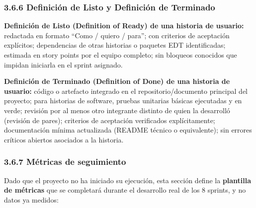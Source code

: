 \documentclass[11pt,a4paper]{article}
\begin{document}
\subsubsection{3.6.6 Definición de Listo y Definición de Terminado}\label{definiciuxf3n-de-listo-y-definiciuxf3n-de-terminado}

\textbf{Definición de Listo (Definition of Ready) de una historia de usuario:} redactada en formato ``Como / quiero / para''; con criterios de aceptación explícitos; dependencias de otras historias o paquetes EDT identificadas; estimada en story points por el equipo completo; sin bloqueos conocidos que impidan iniciarla en el sprint asignado.

\textbf{Definición de Terminado (Definition of Done) de una historia de usuario:} código o artefacto integrado en el repositorio/documento principal del proyecto; para historias de software, pruebas unitarias básicas ejecutadas y en verde; revisión por al menos otro integrante distinto de quien la desarrolló (revisión de pares); criterios de aceptación verificados explícitamente; documentación mínima actualizada (README técnico o equivalente); sin errores críticos abiertos asociados a la historia.

\subsubsection{3.6.7 Métricas de seguimiento}\label{muxe9tricas-de-seguimiento}

Dado que el proyecto no ha iniciado su ejecución, esta sección define la \textbf{plantilla de métricas} que se completará durante el desarrollo real de los 8 sprints, y no datos ya medidos:
\end{document}
